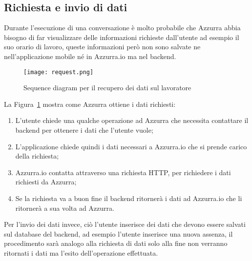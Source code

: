 \subsection{Richiesta e invio di dati}
Durante l'esecuzione di una conversazione è molto probabile che Azzurra abbia bisogno di far visualizzare delle informazioni richieste dall'utente ad esempio il suo orario di lavoro, queste informazioni però non sono salvate ne nell'applicazione mobile né in Azzurra.io ma nel backend.
\begin{figure}[h]
	\begin{center}
		\texttt{[image: request.png]}
		\caption{Sequence diagram per il recupero dei dati sul lavoratore}\label{fig:request}
	\end{center}
\end{figure}
La Figura~\ref{fig:request} mostra come Azzurra ottiene i dati richiesti:
\begin{enumerate}
	\item L'utente chiede una qualche operazione ad Azzurra che necessita contattare il backend per ottenere i dati che l'utente vuole;
	\item L'applicazione chiede quindi i dati necessari a Azzurra.io che si prende carico della richiesta;
	\item Azzurra.io contatta attraverso una richiesta HTTP, per richiedere i dati richiesti da Azzurra;
	\item Se la richiesta va a buon fine il backend ritornerà i dati ad Azzurra.io che li ritornerà a sua volta ad Azzurra.
\end{enumerate}

Per l'invio dei dati invece, ciò l'utente inserisce dei dati che devono essere salvati sul database del backend, ad esempio l'utente inserisce una nuova assenza, il procedimento sarà analogo alla richiesta di dati solo alla fine non verranno ritornati i dati ma l'esito dell'operazione effettuata.
